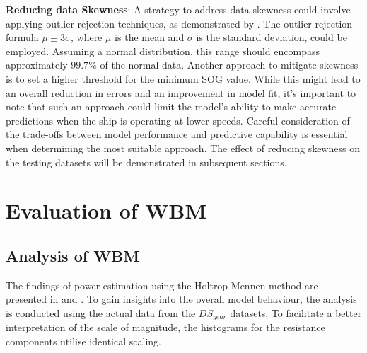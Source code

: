 \textbf{Reducing data Skewness}: A strategy to address data skewness could involve applying outlier rejection techniques, as demonstrated by . The outlier rejection formula $\mu \pm 3\sigma$, where $\mu$ is the mean and $\sigma$ is the standard deviation, could be employed. Assuming a normal distribution, this range should encompass approximately $99.7\%$ of the normal data. Another approach to mitigate skewness is to set a higher threshold for the minimum SOG value. While this might lead to an overall reduction in errors and an improvement in model fit, it's important to note that such an approach could limit the model's ability to make accurate predictions when the ship is operating at lower speeds. Careful consideration of the trade-offs between model performance and predictive capability is essential when determining the most suitable approach. The effect of reducing skewness on the testing datasets will be demonstrated in subsequent sections.\\

\section{Evaluation of WBM}\label{sec:WBM_perf_eval}

\subsection{Analysis of WBM}\label{sec:Power_estimation_actual}

The findings of power estimation using the Holtrop-Mennen method are presented in  and . To gain insights into the overall model behaviour, the analysis is conducted using the actual data from the $DS_{year}$ datasets. To facilitate a better interpretation of the scale of magnitude, the histograms for the resistance components utilise identical scaling.\\

